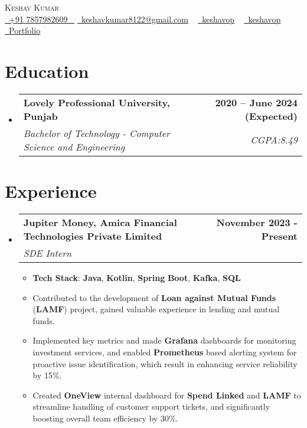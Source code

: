 \documentclass[letterpaper,11pt]{article}
\makeatletter
\newcommand{\resumeItem}[1]{
  \item\small{
    {#1 \vspace{-2pt}}
  }
}
\newcommand{\resumeSubheading}[4]{
  \vspace{-2pt}\item
    \begin{tabular*}{1.0\textwidth}[t]{l@{\extracolsep{\fill}}r}
      \textbf{\large#1} & \textbf{\small #2} \\
      \textit{\large#3} & \textit{\small #4} \\
      
    \end{tabular*}\vspace{-7pt}
}
\newcommand{\resumeSubHeadingListStart}{\begin{itemize}[leftmargin=0.0in, label={}]}
\newcommand{\resumeSubHeadingListEnd}{\end{itemize}}
\newcommand{\resumeItemListStart}{\begin{itemize}}
\newcommand{\resumeItemListEnd}{\end{itemize}\vspace{-5pt}}
\makeatother
\begin{document}


\begin{center}
    {\Huge \scshape Keshav Kumar} \\ \vspace{10pt}
    \small \href{phone:7857982609}{ \raisebox{-0.1\height}\faPhone\ \underline{+91 7857982609} ~} \href{mailto:keshavkumar8122@gmail.com}{\raisebox{-0.2\height}\faEnvelope\  \underline{keshavkumar8122@gmail.com}} ~ 
    \href{https://www.linkedin.com/in/keshavkumar3/}{\raisebox{-0.2\height}\faLinkedinSquare\ \underline{keshavop}}  ~
    \href{https://github.com/Keshavop}{\raisebox{-0.2\height}\faGithub\ \underline{keshavop}} ~
    \href{https://keshavop.in}{\raisebox{-0.2\height}\faUser\ \underline{Portfolio}} ~
    \vspace{-4pt}
\end{center}


\section{Education}
  \resumeSubHeadingListStart
    \resumeSubheading
      {Lovely Professional University, Punjab}{2020 -- June 2024 (Expected)}
      {Bachelor of Technology - Computer Science and Engineering  \textbf{} \textbf{}}{CGPA:8.49}
  \resumeSubHeadingListEnd

\vspace{-3pt}

\section{Experience}
  \resumeSubHeadingListStart
    \resumeSubheading
      {Jupiter Money, Amica Financial Technologies Private Limited}{November 2023 - Present}
      {SDE Intern}{}
      \resumeItemListStart
        \item{
        \textbf{Tech Stack}: \textbf{Java}, \textbf{Kotlin}, \textbf{Spring} \textbf{Boot}, \textbf{Kafka}, \textbf{SQL} \\
        }
        \resumeItem{Contributed to the development of \textbf{Loan against Mutual Funds} (\textbf{LAMF}) project, gained valuable experience in lending and mutual funds.}
        \resumeItem{Implemented key metrics and made \textbf{Grafana} dashboards for monitoring investment services, and enabled \textbf{Prometheus} based alerting system for proactive issue identification, which result in enhancing service reliability by 15\%.}
        \resumeItem{Created \textbf{OneView} internal dashboard for \textbf{Spend Linked} and \textbf{LAMF} to streamline handling of customer support tickets,  and significantly boosting overall team efficiency by 30\%.}
      \resumeItemListEnd 
  \resumeSubHeadingListEnd
\end{document}
